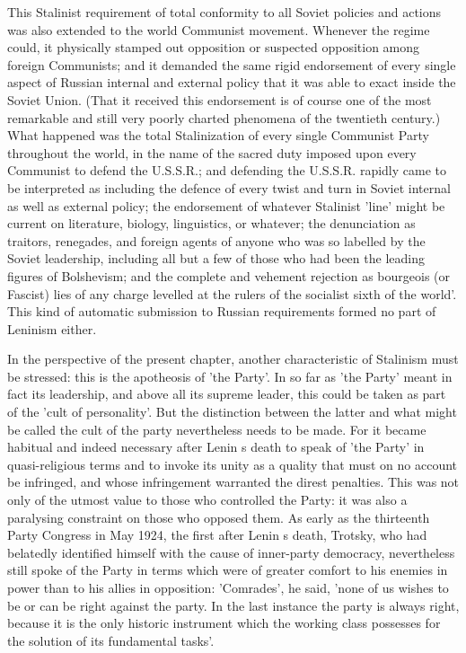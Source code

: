 This Stalinist requirement of total conformity to all Soviet policies and actions was also extended to the world Communist movement. Whenever the regime could, it physically stamped out opposition or suspected opposition among foreign Communists; and it demanded the same rigid endorsement of every single aspect of Russian internal and external policy that it was able to exact inside the Soviet Union. (That it received this endorsement is of course one of the most remarkable and still very poorly charted phenomena of the twentieth century.) What happened was the total Stalinization of every single Communist Party throughout the world, in the name of the sacred duty imposed upon every Communist to defend the U.S.S.R.; and defending the U.S.S.R. rapidly came to be interpreted as including the defence of every twist and turn in Soviet internal as well as external policy; the endorsement of whatever Stalinist 'line' might be current on literature, biology, linguistics, or whatever; the denunciation as traitors, renegades, and foreign agents of anyone who was so labelled by the Soviet leadership, including all but a few of those who had been the leading figures of Bolshevism; and the complete and vehement rejection as bourgeois (or Fascist) lies of any charge levelled at the rulers of the socialist sixth of the world'. This kind of automatic submission to Russian requirements formed no part of Leninism either.

In the perspective of the present chapter, another characteristic of Stalinism must be stressed: this is the apotheosis of 'the Party'. In so far as 'the Party' meant in fact its leadership, and above all its supreme leader, this could be taken as part of the 'cult of personality'. But the distinction between the latter and what might be called the cult of the party nevertheless needs to be made. For it became habitual and indeed necessary after Lenin s death to speak of 'the Party' in quasi\hyp{}religious terms and to invoke its unity as a quality that must on no account be infringed, and whose infringement warranted the direst penalties. This was not only of the utmost value to those who controlled the Party: it was also a paralysing constraint on those who opposed them. As early as the thirteenth Party Congress in May 1924, the first after Lenin s death, Trotsky, who had belatedly identified himself with the cause of inner-party democracy, nevertheless still spoke of the Party in terms which were of  greater comfort to his enemies in power than to his allies in opposition: 'Comrades', he said, 'none of us wishes to be or can be right against the party. In the last instance the party is always right, because it is the only historic instrument which the working class possesses for the solution of its fundamental tasks'.

